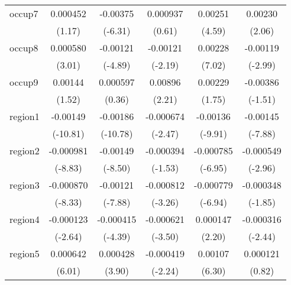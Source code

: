 \begin{table}[htbp]
\begin{tabular}{l*{5}{c}}
occup7      &    0.000452         &    -0.00375\sym{***}&    0.000937         &     0.00251\sym{***}&     0.00230\sym{*}  \\
            &      (1.17)         &     (-6.31)         &      (0.61)         &      (4.59)         &      (2.06)         \\
occup8      &    0.000580\sym{**} &    -0.00121\sym{***}&    -0.00121\sym{*}  &     0.00228\sym{***}&    -0.00119\sym{**} \\
            &      (3.01)         &     (-4.89)         &     (-2.19)         &      (7.02)         &     (-2.99)         \\
occup9      &     0.00144         &    0.000597         &     0.00896\sym{*}  &     0.00229         &    -0.00386         \\
            &      (1.52)         &      (0.36)         &      (2.21)         &      (1.75)         &     (-1.51)         \\
region1     &    -0.00149\sym{***}&    -0.00186\sym{***}&   -0.000674\sym{*}  &    -0.00136\sym{***}&    -0.00145\sym{***}\\
            &    (-10.81)         &    (-10.78)         &     (-2.47)         &     (-9.91)         &     (-7.88)         \\
region2     &   -0.000981\sym{***}&    -0.00149\sym{***}&   -0.000394         &   -0.000785\sym{***}&   -0.000549\sym{**} \\
            &     (-8.83)         &     (-8.50)         &     (-1.53)         &     (-6.95)         &     (-2.96)         \\
region3     &   -0.000870\sym{***}&    -0.00121\sym{***}&   -0.000812\sym{**} &   -0.000779\sym{***}&   -0.000348         \\
            &     (-8.33)         &     (-7.88)         &     (-3.26)         &     (-6.94)         &     (-1.85)         \\
region4     &   -0.000123\sym{**} &   -0.000415\sym{***}&   -0.000621\sym{***}&    0.000147\sym{*}  &   -0.000316\sym{*}  \\
            &     (-2.64)         &     (-4.39)         &     (-3.50)         &      (2.20)         &     (-2.44)         \\
region5     &    0.000642\sym{***}&    0.000428\sym{***}&   -0.000419\sym{*}  &     0.00107\sym{***}&    0.000121         \\
            &      (6.01)         &      (3.90)         &     (-2.24)         &      (6.30)         &      (0.82)         \\

\end{tabular}
\end{table}
